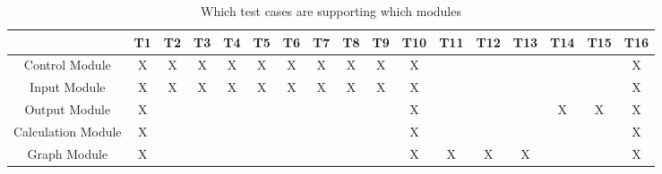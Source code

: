 
\begin{table}[H]
\centering
\begin{tabular}{|c|c|c|c|c|c|c|c|c|c|c|c|c|c|c|c|c|}
\hline
	& T1 & T2 & T3 & T4 & T5 & T6 & T7 & T8 & T9 & T10 & T11 & T12 & T13 & T14 & T15 & T16\\
\hline
Control Module     &X&X&X&X&X&X&X&X&X&X& & & & & &X \\ \hline
Input Module       &X&X&X&X&X&X&X&X&X&X& & & & & &X \\ \hline
Output Module      &X& & & & & & & & &X& & & &X&X&X \\ \hline
Calculation Module &X& & & & & & & & &X& & & & & &X \\ \hline
Graph Module       &X& & & & & & & & &X&X&X&X& & &X \\ \hline
\end{tabular}
\caption{Which test cases are supporting which modules}
\label{Table:test_support}
\end{table}